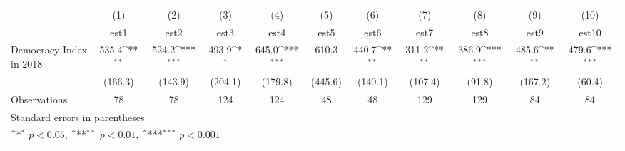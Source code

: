 {
\def\sym#1{\ifmmode^{#1}\else\(^{#1}\)\fi}
\begin{tabular}{l*{10}{c}}
\hline\hline
                    &\multicolumn{1}{c}{(1)}         &\multicolumn{1}{c}{(2)}         &\multicolumn{1}{c}{(3)}         &\multicolumn{1}{c}{(4)}         &\multicolumn{1}{c}{(5)}         &\multicolumn{1}{c}{(6)}         &\multicolumn{1}{c}{(7)}         &\multicolumn{1}{c}{(8)}         &\multicolumn{1}{c}{(9)}         &\multicolumn{1}{c}{(10)}         \\
                    &        est1         &        est2         &        est3         &        est4         &        est5         &        est6         &        est7         &        est8         &        est9         &       est10         \\
\hline
Democracy Index in 2018&       535.4\sym{**} &       524.2\sym{***}&       493.9\sym{*}  &       645.0\sym{***}&       610.3         &       440.7\sym{**} &       311.2\sym{**} &       386.9\sym{***}&       485.6\sym{**} &       479.6\sym{***}\\
                    &     (166.3)         &     (143.9)         &     (204.1)         &     (179.8)         &     (445.6)         &     (140.1)         &     (107.4)         &      (91.8)         &     (167.2)         &      (60.4)         \\
\hline
Observations        &          78         &          78         &         124         &         124         &          48         &          48         &         129         &         129         &          84         &          84         \\
\hline\hline
\multicolumn{11}{l}{\footnotesize Standard errors in parentheses}\\
\multicolumn{11}{l}{\footnotesize \sym{*} \(p<0.05\), \sym{**} \(p<0.01\), \sym{***} \(p<0.001\)}\\
\end{tabular}
}
